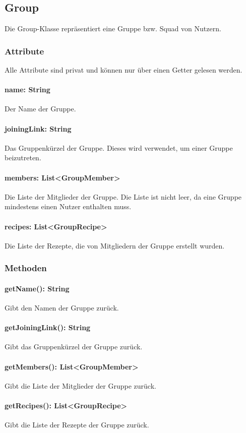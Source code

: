 \documentclass[parskip=full]{scrartcl}
\begin{document}
\subsection{Group}
Die Group-Klasse repräsentiert eine Gruppe bzw. Squad von Nutzern.
\subsubsection{Attribute}
Alle Attribute sind privat und können nur über einen Getter gelesen werden.
\paragraph{name: String}
Der Name der Gruppe.
\paragraph{joiningLink: String}
Das Gruppenkürzel der Gruppe. Dieses wird verwendet, um einer Gruppe beizutreten.
\paragraph{members: List<GroupMember>}
Die Liste der Mitglieder der Gruppe. Die Liste ist nicht leer, da eine Gruppe mindestens einen Nutzer enthalten muss.
\paragraph{recipes: List<GroupRecipe>}
Die Liste der Rezepte, die von Mitgliedern der Gruppe erstellt wurden.

\subsubsection{Methoden}
\paragraph{getName(): String}
Gibt den Namen der Gruppe zurück.
\paragraph{getJoiningLink(): String}
Gibt das Gruppenkürzel der Gruppe zurück.
\paragraph{getMembers(): List<GroupMember>}
Gibt die Liste der Mitglieder der Gruppe zurück.
\paragraph{getRecipes(): List<GroupRecipe>}
Gibt die Liste der Rezepte der Gruppe zurück.
\end{document}
